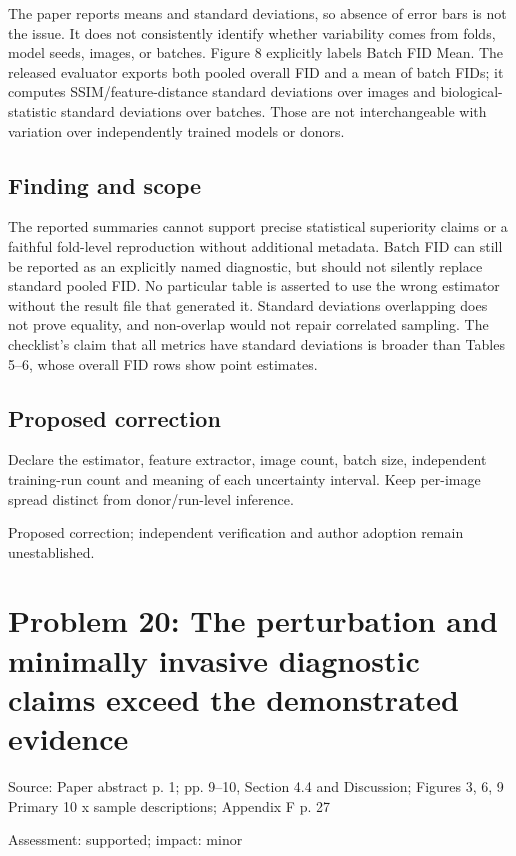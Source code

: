 \documentclass[11pt]{article}
\begin{document}
The paper reports means and standard deviations, so absence of error bars is not the issue. It does not consistently identify whether variability comes from folds, model seeds, images, or batches. Figure 8 explicitly labels Batch FID Mean. The released evaluator exports both pooled overall FID and a mean of batch FIDs; it computes SSIM/feature-distance standard deviations over images and biological-statistic standard deviations over batches. Those are not interchangeable with variation over independently trained models or donors.

\subsection*{Finding and scope}

The reported summaries cannot support precise statistical superiority claims or a faithful fold-level reproduction without additional metadata. Batch FID can still be reported as an explicitly named diagnostic, but should not silently replace standard pooled FID. No particular table is asserted to use the wrong estimator without the result file that generated it. Standard deviations overlapping does not prove equality, and non-overlap would not repair correlated sampling. The checklist's claim that all metrics have standard deviations is broader than Tables 5–6, whose overall FID rows show point estimates.

\subsection*{Proposed correction}

Declare the estimator, feature extractor, image count, batch size, independent training-run count and meaning of each uncertainty interval. Keep per-image spread distinct from donor/run-level inference.

Proposed correction; independent verification and author adoption remain unestablished.

\section*{Problem 20: The perturbation and minimally invasive diagnostic claims exceed the demonstrated evidence}

Source: Paper abstract p. 1; pp. 9–10, Section 4.4 and Discussion; Figures 3, 6, 9 Primary 10 x sample descriptions; Appendix F p. 27

Assessment: supported; impact: minor
\end{document}
